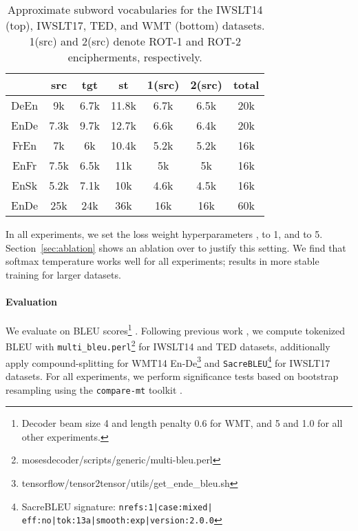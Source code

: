 \documentclass[11pt]{article}
\begin{document}
\begin{table}[ht]
\small
\centering
\scalebox{0.9}
{
\begin{tabular}{ccccccc}
\toprule
\textbf{} & \textbf{src}    & \textbf{tgt}    & \textbf{st} & \textbf{1(src)} & \textbf{2(src)} & \textbf{total} \\ \midrule
  DeEn         & 9k & 6.7k & 11.8k      & 6.7k     & 6.5k     & 20k   \\
 EnDe         &   7.3k   & 9.7k     &      12.7k      &  6.6k  &  6.4k   & 20k   \\ \midrule
 FrEn         &  7k    &  6k    &    10.4k  &    5.2k      &     5.2k     & 16k   \\
 EnFr         &   7.5k   & 6.5k    &  11k      &  5k  &  5k          & 16k   \\ \midrule

 EnSk         &  5.2k    & 7.1k     &   10k         &    4.6k      &  4.5k        & 16k   \\\midrule
 EnDe         &   25k   &  24k   & 36k &  16k & 16k  & 60k  
\\ \bottomrule 
\end{tabular}
}
\caption{Approximate subword vocabularies for the IWSLT14 (top), IWSLT17, TED, and WMT (bottom) datasets. 1(src) and 2(src) denote ROT-1 and ROT-2 encipherments, respectively.}
\label{tab:bpevocab}
\end{table}




In all experiments, we set the loss weight hyperparameters ,  to 1, and  to 5. Section~\ref{sec:ablation} shows an ablation over  to justify this setting. We find that softmax temperature  works well for all experiments;  results in more stable training for larger datasets.
\vspace{-0.5em}
\paragraph{Evaluation} We evaluate on BLEU scores\footnote{Decoder beam size 4 and length penalty 0.6 for WMT, and 5 and 1.0 for all other experiments.} \cite{papineni-etal-2002-bleu}. Following previous work \cite{vaswani2017attention,nguyen19datadiverse, xu2021bert}, we compute tokenized BLEU with \texttt{multi\_bleu.perl}\footnote{mosesdecoder/scripts/generic/multi-bleu.perl} for IWSLT14 and TED datasets, additionally apply compound-splitting for WMT14 En-De\footnote{tensorflow/tensor2tensor/utils/get\_ende\_bleu.sh} and \texttt{SacreBLEU}\footnote{SacreBLEU signature: \texttt{nrefs:1|case:mixed|} \texttt{eff:no|tok:13a|smooth:exp|version:2.0.0}} \cite{post-2018-call} for IWSLT17 datasets. For all experiments, we perform significance tests based on bootstrap resampling \cite{clark2011better} using the \texttt{compare-mt} toolkit \cite{neubig-etal-2019-compare}.
\end{document}
